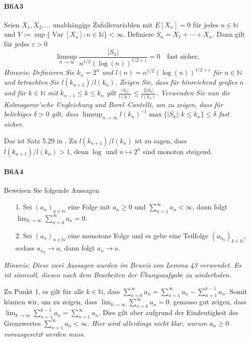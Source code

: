 \documentclass{article}
\begin{document}
\paragraph{B6A3}
Seien $X_1,X_2,\dots$ unabhängige Zufallsvariablen mit $E[X_n]=0$ für jedes $n\in\mathbb{N}$ und $V:=\sup\{\operatorname{Var}[X_n]:n\in\mathbb{N}\}<\infty$.
Definiere $S_n=X_1+\cdots+X_n$.
Dann gilt für jedes $\varepsilon>0$
\[
  \limsup_{n\to\infty}\frac{|S_n|}{n^{1/2}(\log(n))^{1/2+\varepsilon}}=0\quad\text{fast sicher.}
\]
\emph{Hinweis: Definieren Sie $k_n=2^n$ und $l(n)=n^{1/2}(\log(n))^{1/2+\varepsilon}$ für $n\in\mathbb{N}$ und betrachten Sie $l(k_{n+1})/l(k_n)$.
  Zeigen Sie, dass für hinreichend großes $n$ und für $k\in\mathbb{N}$ mit $k_{n-1}\leq k\leq k_n$ gilt $\frac{|S_k|}{l(k)}\leq\frac{2|S_k|}{l({k_n})}$.
  Verwenden Sie nun die Kolmogorov'sche Ungleichung und Borel--Cantelli, um zu zeigen, dass für beliebiges $\delta>0$ gilt, dass $\limsup_{n\to\infty}l(k_n)^{-1}\max\{|S_k|: k\leq k_n\}\leq\delta$ fast sicher.}

Das ist Satz 5.29 in \cite{klenke}.
Zu $l(k_{n+1})/l(k_n)$ ist zu sagen, dass $l(k_{n+1})/l(k_n)>1$, denn $\log$ und $n\mapsto 2^n$ sind monoton steigend.


\newpage

\paragraph{B6A4}
Beweisen Sie folgende Aussagen
\begin{enumerate}
\item[1.] Sei $(a_n)_{n\in\mathbb{N}}$ eine Folge mit $a_n\geq0$ und $\sum_{n=1}^\infty a_n<\infty$, dann folgt $\lim_{k\to\infty}\sum_{n=k}^\infty a_n=0$.
\item[2.] Sei $(a_n)_{n\in\mathbb{N}}$ eine monotone Folge und es gebe eine Teilfolge $(a_{n_k})_{k\in\mathbb{N}}$, sodass $a_{n_k}\to a$, dann folgt $a_n\to a$.
\end{enumerate}
\emph{Hinweis: Diese zwei Aussagen wurden im Beweis von Lemma 43 verwendet.
  Es ist sinnvoll, diesen nach dem Bearbeiten der Übungsaufgabe zu wiederholen.}

Zu Punkt 1, es gilt für alle $k\in\mathbb{N}$, dass $\sum_{n=k}^\infty a_n=\sum_{n=1}^\infty a_n-\sum_{n=1}^{k-1}a_n$.
Somit können wir, um zu zeigen, dass $\lim_{k\to\infty}\sum_{n=k}^\infty a_n=0$, genauso gut zeigen, dass $\lim_{k\to\infty}\sum_{n=1}^{k-1}a_n=\sum_{n=1}^\infty a_n$.
Dies gilt aber aufgrund der Eindeutigkeit des Grenzwertes $\sum_{n=1}^\infty a_n<\infty$.
\emph{Hier wird allerdings nicht klar, warum $a_n\geq0$ vorausgesetzt werden muss.}
\end{document}
